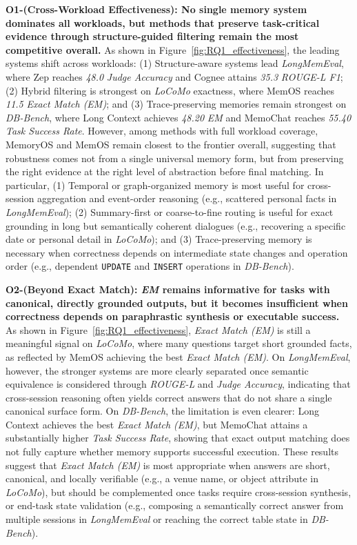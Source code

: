 \noindent \textbf{O1-(Cross-Workload Effectiveness): No single memory system dominates all workloads, but methods that preserve task-critical evidence through structure-guided filtering remain the most competitive overall.}
As shown in Figure~\ref{fig:RQ1_effectiveness}, the leading systems shift across workloads: (1) Structure-aware systems lead \textit{LongMemEval}, where Zep reaches \textit{48.0} \textit{\llm Judge Accuracy} and Cognee attains \textit{35.3} \textit{ROUGE-L F1}; 
(2) Hybrid filtering is strongest on \textit{LoCoMo} exactness, where MemOS reaches \textit{11.5} \textit{Exact Match (EM)}; and (3) Trace-preserving memories remain strongest on \textit{DB-Bench}, where Long Context achieves \textit{48.20} \textit{EM} and MemoChat reaches \textit{55.40} \textit{Task Success Rate}.
However, among methods with full workload coverage, MemoryOS and MemOS remain closest to the frontier overall, suggesting that robustness comes not from a single universal memory form, but from preserving the right evidence at the right level of abstraction before final matching.
In particular, (1) Temporal or graph-organized memory is most useful for cross-session aggregation and event-order reasoning (e.g., scattered personal facts in \textit{LongMemEval}); (2) Summary-first or coarse-to-fine routing is useful for exact grounding in long but semantically coherent dialogues (e.g., recovering a specific date or personal detail in \textit{LoCoMo}); and (3) Trace-preserving memory is necessary when correctness depends on intermediate state changes and operation order (e.g., dependent \texttt{UPDATE} and \texttt{INSERT} operations in \textit{DB-Bench}).

\noindent \textbf{O2-(Beyond Exact Match): \textit{EM} remains informative for tasks with canonical, directly grounded outputs, but it becomes insufficient when correctness depends on paraphrastic synthesis or executable success.}
As shown in Figure~\ref{fig:RQ1_effectiveness}, \textit{Exact Match (EM)} is still a meaningful signal on \textit{LoCoMo}, where many questions target short grounded facts, as reflected by MemOS achieving the best \textit{Exact Match (EM)}. 
On \textit{LongMemEval}, however, the stronger systems are more clearly separated once semantic equivalence is considered through \textit{ROUGE-L} and \textit{\llm Judge Accuracy}, indicating that cross-session reasoning often yields correct answers that do not share a single canonical surface form.
On \textit{DB-Bench}, the limitation is even clearer: Long Context achieves the best \textit{Exact Match (EM)}, but MemoChat attains a substantially higher \textit{Task Success Rate}, showing that exact output matching does not fully capture whether memory supports successful execution.
These results suggest that \textit{Exact Match (EM)} is most appropriate when answers are short, canonical, and locally verifiable (e.g., a venue name, or object attribute in \textit{LoCoMo}), but should be complemented once tasks require cross-session synthesis, or end-task state validation (e.g., composing a semantically correct answer from multiple sessions in \textit{LongMemEval} or reaching the correct table state in \textit{DB-Bench}).

